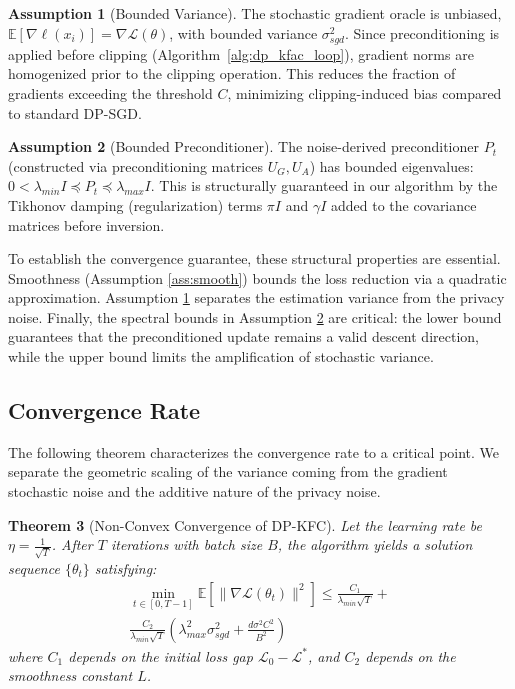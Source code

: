 \documentclass{article}
\theoremstyle{plain}
\newtheorem{theorem}{Theorem}[section]
\theoremstyle{definition}
\newtheorem{assumption}[theorem]{Assumption}
\theoremstyle{remark}
\begin{document}
\begin{assumption}[Bounded Variance]
\label{ass:bounded}
The stochastic gradient oracle is unbiased, $\mathbb{E}[\nabla \ell(x_i)] = \nabla \mathcal{L}(\theta)$, with bounded variance $\sigma_{sgd}^2$. Since preconditioning is applied before clipping (Algorithm~\ref{alg:dp_kfac_loop}), gradient norms are homogenized prior to the clipping operation. This reduces the fraction of gradients exceeding the threshold $C$, minimizing clipping-induced bias compared to standard DP-SGD.
\end{assumption}

\begin{assumption}[Bounded Preconditioner]
\label{ass:bounded_pre}
The noise-derived preconditioner $P_t$ (constructed via preconditioning matrices $U_G, U_A$) has bounded eigenvalues: $0 < \lambda_{min} I \preceq P_t \preceq \lambda_{max} I$. This is structurally guaranteed in our algorithm by the Tikhonov damping (regularization) terms $\pi I$ and $\gamma I$ added to the covariance matrices before inversion.
\end{assumption}

To establish the convergence guarantee, these structural properties are essential. Smoothness (Assumption \ref{ass:smooth}) bounds the loss reduction via a quadratic approximation. Assumption \ref{ass:bounded} separates the estimation variance from the privacy noise. Finally, the spectral bounds in Assumption \ref{ass:bounded_pre} are critical: the lower bound guarantees that the preconditioned update remains a valid descent direction, while the upper bound limits the amplification of stochastic variance.

\subsection{Convergence Rate}

The following theorem characterizes the convergence rate to a critical point. We separate the geometric scaling of the variance coming from the gradient stochastic noise and the additive nature of the privacy noise.

\begin{theorem}[Non-Convex Convergence of DP-KFC]
\label{thm:convergence}
Let the learning rate be $\eta = \frac{1}{\sqrt{T}}$. After $T$ iterations with batch size $B$, the algorithm yields a solution sequence $\{\theta_t\}$ satisfying:
\begin{multline}
\label{eq:convergence_bound}
    \min_{t \in [0, T-1]} \mathbb{E}[\|\nabla \mathcal{L}(\theta_t)\|^2] \le \frac{C_1}{\lambda_{min} \sqrt{T}} + \\
    \frac{C_2}{\lambda_{min} \sqrt{T}} \left( \lambda_{max}^2 \sigma_{sgd}^2 + \frac{d \sigma^2 C^2}{B^2} \right)
\end{multline}
where $C_1$ depends on the initial loss gap $\mathcal{L}_0 - \mathcal{L}^*$, and $C_2$ depends on the smoothness constant $L$.
\end{theorem}
\end{document}
